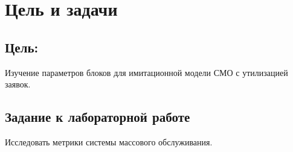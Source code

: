 \chapter{Цель и задачи}
\label{ch:intro}

\section*{\textbf{Цель:}} 

Изучение параметров блоков для имитационной модели
СМО с утилизацией заявок.

\section*{Задание к лабораторной работе}

Исследовать метрики системы массового обслуживания.

\endinput